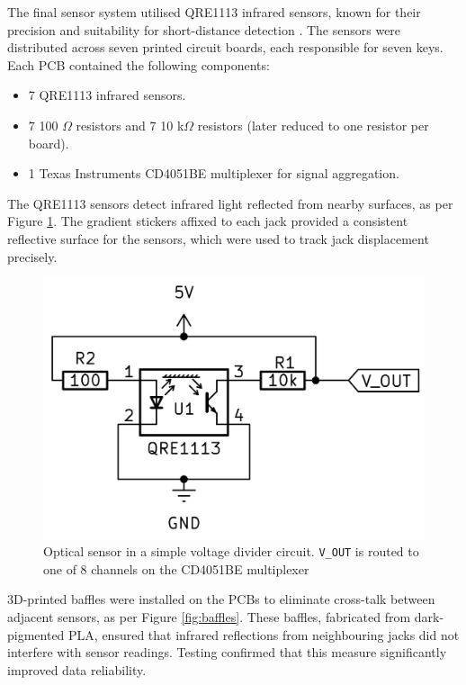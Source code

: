 The final sensor system utilised QRE1113 infrared sensors, known for their precision and suitability for short-distance detection \cite{McPherson2013, McPherson2019}. The sensors were distributed across seven printed circuit boards, each responsible for seven keys. Each PCB contained the following components:

\begin{itemize}
    \item 7 QRE1113 infrared sensors.
    \item 7 100 $\Omega$ resistors and 7 10 k$\Omega$ resistors (later reduced to one resistor per board).
    \item 1 Texas Instruments CD4051BE multiplexer for signal aggregation.
\end{itemize}

The QRE1113 sensors detect infrared light reflected from nearby surfaces, as per Figure \ref{fig:simple-schematic}. The gradient stickers affixed to each jack provided a consistent reflective surface for the sensors, which were used to track jack displacement precisely. 

\begin{figure}[b]  
  \centering
  \includegraphics[width=\linewidth]{src/images/simple-schematic-bw-.jpg} 
  \caption{Optical sensor in a simple voltage divider circuit. \texttt{V\_OUT} is routed to one of 8 channels on the CD4051BE multiplexer}
  \Description{} 
  \label{fig:simple-schematic}
\end{figure}



3D-printed baffles were installed on the PCBs to eliminate cross-talk between adjacent sensors, as per Figure \ref{fig:baffles}. These baffles, fabricated from dark-pigmented PLA, ensured that infrared reflections from neighbouring jacks did not interfere with sensor readings. Testing confirmed that this measure significantly improved data reliability.


